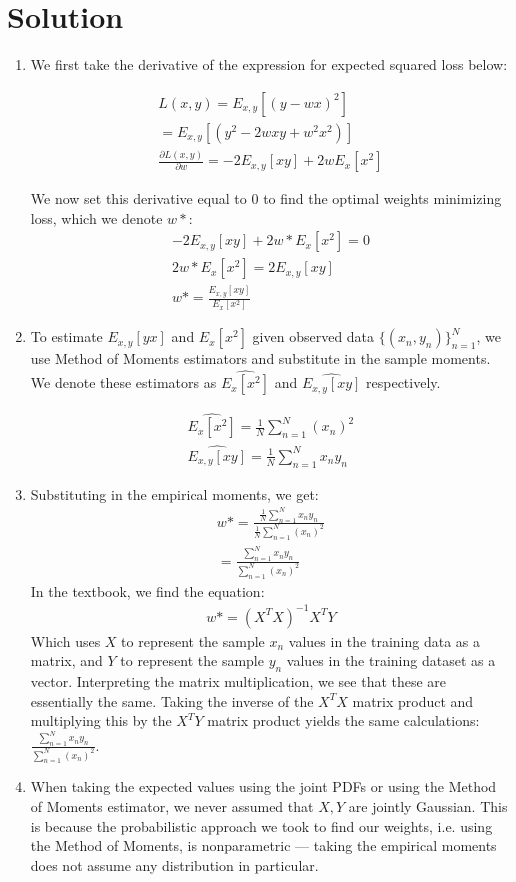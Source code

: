 \documentclass[submit]{harvardml}
\newenvironment{solution}
  {\color{blue}\section*{Solution}}
{}
\begin{document}
\begin{solution}
\begin{enumerate}
    \item We first take the derivative of the expression for expected squared loss below:

    \begin{align*}
    L(x,y) = E_{x,y}[(y-wx)^2] \\
    = E_{x,y}[(y^2 - 2wxy + w^2x^2)] \\
    \frac{\partial L(x,y)}{\partial w} = -2E_{x,y}[xy] + 2wE_x[x^2] 
    \end{align*}

    We now set this derivative equal to 0 to find the optimal weights minimizing loss, which we denote $w*$:
    \begin{align*}
    -2E_{x,y}[xy] + 2w*E_x[x^2]  = 0\\
     2w*E_x[x^2] = 2E_{x,y}[xy]\\
     w* = \frac{E_{x,y}[xy]}{E_x[x^2]}
    \end{align*}
    \item To estimate $E_{x, y}[yx]$
 and $E_x[x^2]$ given observed data $\{(x_n,y_n)\}_{n=1}^N$, we use Method of Moments estimators and substitute in the sample moments. We denote these estimators as $\hat{E_x[x^2]}$ and $\hat{E_{x,y}[xy]}$ respectively.

 \begin{align*}
     \hat{E_x[x^2]} = \frac{1}{N}\sum_{n=1}^N (x_n)^2\\
     \hat{E_{x,y}[xy]} = \frac{1}{N} \sum_{n=1}^N x_ny_n
 \end{align*}
    \item Substituting in the empirical moments, we get:
    \begin{align*}
        w* = \frac{\frac{1}{N} \sum_{n=1}^N x_ny_n}{\frac{1}{N}\sum_{n=1}^N (x_n)^2}\\
        = \frac{\sum_{n=1}^N x_ny_n}{\sum_{n=1}^N (x_n)^2}
    \end{align*}
    In the textbook, we find the equation:
    \begin{align*}
        w* = (X^TX)^{-1}X^TY
    \end{align*}
    Which uses $X$ to represent the sample $x_n$ values in the training data as a matrix, and $Y$ to represent the sample $y_n$ values in the training dataset as a vector. Interpreting the matrix multiplication, we see that these are essentially the same. Taking the inverse of the $X^TX$ matrix product and multiplying this by the $X^TY$ matrix product yields the same calculations: $\frac{\sum_{n=1}^N x_ny_n}{\sum_{n=1}^N (x_n)^2}$.
    \item When taking the expected values using the joint PDFs or using the Method of Moments estimator, we never assumed that $X,Y$ are jointly Gaussian. This is because the probabilistic approach we took to find our weights, i.e. using the Method of Moments, is nonparametric — taking the empirical moments does not assume any distribution in particular.
\end{enumerate}
\end{solution}
\end{document}
